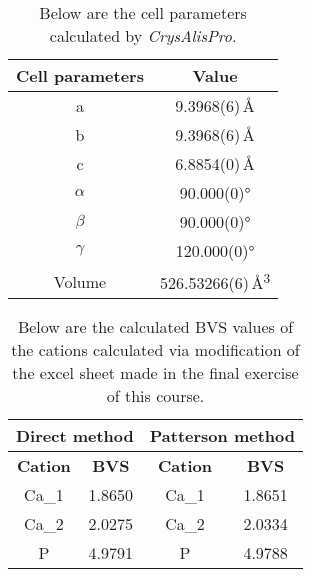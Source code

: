\documentclass[]{scrartcl}
\begin{document}
\begin{table}[H]
	\centering
	\caption[Cell parameters]{Below are the cell parameters calculated by \emph{CrysAlisPro}.}
	\begin{minipage}{0.45\textwidth}
		\centering
		\begin{tabular}{c|c}
			\cellcolor{Salmon} Cell parameters & \cellcolor{Salmon} Value\\
			\midrule
			a & 9.3968(6)\,\AA\\
			b & 9.3968(6)\,\AA\\
			c & 6.8854(0)\,\AA\\
			$\alpha$ & 90.000(0)° \\
			$\beta$ & 90.000(0)° \\
			$\gamma$ & 120.000(0)° \\
			Volume & 526.53266(6)\,\AA\textsuperscript{3}\\
		\end{tabular}\label{param}
	\end{minipage}
\end{table}

\begin{table}[H]
	\caption{Below are the calculated BVS values of the cations calculated via modification of the excel sheet made in the final exercise of this course.}
	\footnotesize
	\centering
	\begin{tabular}{|c|c|c|c|}
		\multicolumn{2}{c}{\cellcolor{Aquamarine} Direct method} & \multicolumn{2}{c}{\cellcolor{LimeGreen} Patterson method}\\
		\hline
		\textbf{Cation} &\textbf{ BVS} & \textbf{Cation}& \textbf{BVS}\\
		\hline
		Ca\_1 & 1.8650 & Ca\_1 & 1.8651\\
		\hline
		Ca\_2 & 2.0275 & Ca\_2 & 2.0334\\
		\hline
		P & 4.9791 & P & 4.9788\\
		\hline
	\end{tabular}\label{bvs}
\end{table}
\end{document}

